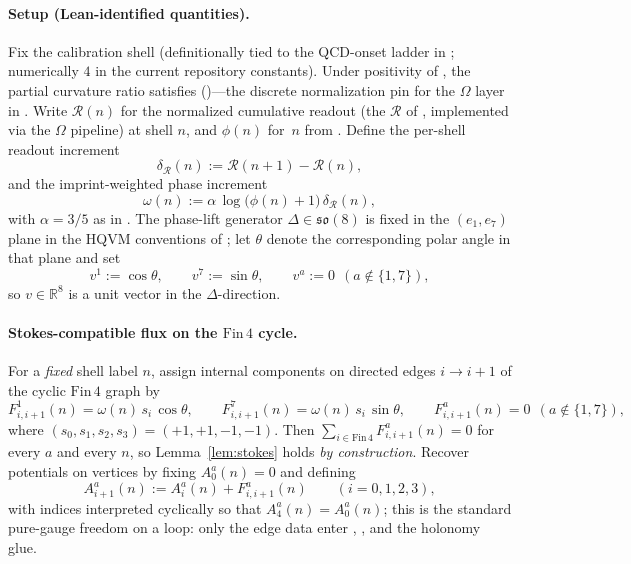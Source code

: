 \documentclass[11pt]{amsart}
\begin{document}
\paragraph{Setup (Lean-identified quantities).}
Fix the calibration shell  (definitionally tied to the QCD-onset ladder in ; numerically \(4\) in the current repository constants). Under positivity of , the partial curvature ratio satisfies  ()---the discrete normalization pin for the \(\Omega\) layer in \cite{hqiv-so8-paper}. Write \(\mathcal{R}(n)\) for the normalized cumulative readout (the \(\mathcal{R}\) of \cite{hqiv-so8-paper}, implemented via the \(\Omega\) pipeline) at shell \(n\), and \(\phi(n)\) for \(\,n\) from . Define the per-shell readout increment
\[
\delta_{\mathcal{R}}(n):=\mathcal{R}(n+1)-\mathcal{R}(n),
\]
and the imprint-weighted phase increment
\begin{equation}
\label{eq:omega-n}
\omega(n):=\alpha\,\log\bigl(\phi(n)+1\bigr)\,\delta_{\mathcal{R}}(n),
\end{equation}
with \(\alpha=3/5\) as in . The phase-lift generator \(\Delta\in\mathfrak{so}(8)\) is fixed in the \((e_1,e_7)\) plane in the HQVM conventions of \cite{hqiv-so8-paper}; let \(\theta\) denote the corresponding polar angle in that plane and set
\[
v^1:=\cos\theta,\qquad v^7:=\sin\theta,\qquad v^a:=0\ \ (a\notin\{1,7\}),
\]
so \(v\in\mathbb{R}^8\) is a unit vector in the \(\Delta\)-direction.

\paragraph{Stokes-compatible flux on the \(\mathrm{Fin}\,4\) cycle.}
For a \emph{fixed} shell label \(n\), assign internal components on directed edges \(i\to i+1\) of the cyclic \(\mathrm{Fin}\,4\) graph by
\begin{equation}
\label{eq:seed-F}
F^1_{i,i+1}(n)=\omega(n)\,s_i\,\cos\theta,\qquad
F^7_{i,i+1}(n)=\omega(n)\,s_i\,\sin\theta,\qquad
F^a_{i,i+1}(n)=0\ \ (a\notin\{1,7\}),
\end{equation}
where \((s_0,s_1,s_2,s_3)=(+1,+1,-1,-1)\). Then \(\sum_{i\in \mathrm{Fin}\,4} F^a_{i,i+1}(n)=0\) for every \(a\) and every \(n\), so Lemma~\ref{lem:stokes} holds \emph{by construction}. Recover potentials on vertices by fixing \(A^a_0(n)=0\) and defining
\[
A^a_{i+1}(n):=A^a_i(n)+F^a_{i,i+1}(n)\qquad (i=0,1,2,3),
\]
with indices interpreted cyclically so that \(A^a_4(n)=A^a_0(n)\); this is the standard pure-gauge freedom on a loop: only the edge data enter , , and the holonomy glue.
\end{document}
